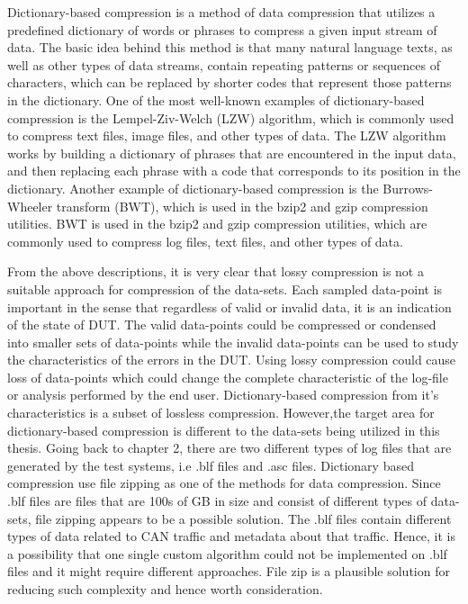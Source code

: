 Dictionary-based compression is a method of data compression that utilizes a predefined dictionary of words or phrases to compress a given input stream of data. The basic idea behind this method is that many natural language texts, as well as other types of data streams, contain repeating patterns or sequences of characters, which can be replaced by shorter codes that represent those patterns in the dictionary. One of the most well-known examples of dictionary-based compression is the Lempel-Ziv-Welch (LZW) algorithm, which is commonly used to compress text files, image files, and other types of data. The LZW algorithm works by building a dictionary of phrases that are encountered in the input data, and then replacing each phrase with a code that corresponds to its position in the dictionary. Another example of dictionary-based compression is the Burrows-Wheeler transform (BWT), which is used in the bzip2 and gzip compression utilities. BWT is used in the bzip2 and gzip compression utilities, which are commonly used to compress log files, text files, and other types of data. 

From the above descriptions, it is very clear that lossy compression is not a suitable approach for compression of the data-sets. Each sampled data-point is important in the sense that regardless of valid or invalid data, it is an indication of the state of DUT. The valid data-points could be compressed or condensed into smaller sets of data-points while the invalid data-points can be used to study the characteristics of the errors in the DUT. Using lossy compression could cause loss of data-points which could change the complete characteristic of the log-file or analysis performed by the end user. 
Dictionary-based compression from it's characteristics is a subset of lossless compression. However,the target area for dictionary-based compression is different to the data-sets being utilized in this thesis. Going back to chapter 2, there are two different types of log files that are generated by the test systems, i.e .blf files and .asc files. Dictionary based compression use file zipping as one of the methods for data compression. Since .blf files are files that are 100s of GB in size and consist of different types of data-sets, file zipping appears to be a possible solution. The .blf files contain different types of data related to CAN traffic and metadata about that traffic. Hence, it is a possibility that one single custom algorithm could not be implemented on .blf files and it might require different approaches. File zip is a plausible solution for reducing such complexity and hence worth consideration. 

